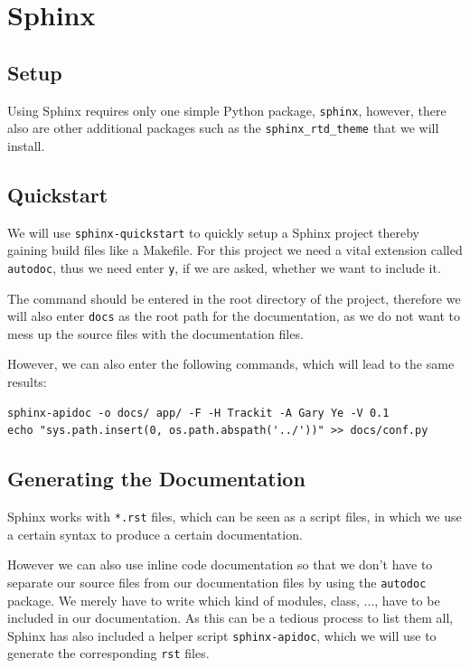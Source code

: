 \documentclass[../main/main.tex]{subfiles}
\begin{document}
\section{Sphinx}

\subsection{Setup}

Using Sphinx requires only one simple Python package, \lstinline|sphinx|,
however, there also are other additional packages such as the
\lstinline|sphinx_rtd_theme| that we will install. 

\subsection{Quickstart}

We will use \lstinline|sphinx-quickstart| to quickly setup a Sphinx project
thereby gaining build files like a Makefile. For this project we need a vital
extension called \lstinline|autodoc|, thus we need enter \lstinline|y|, if we
are asked, whether we want to include it. 

The command should be entered in the root directory of the project, therefore
we will also enter \lstinline|docs| as the root path for the documentation, as
we do not want to mess up the source files with the documentation files. 

However, we can also enter the following commands, which will lead to the same
results: 

\begin{lstlisting}
sphinx-apidoc -o docs/ app/ -F -H Trackit -A Gary Ye -V 0.1
echo "sys.path.insert(0, os.path.abspath('../'))" >> docs/conf.py
\end{lstlisting}

\subsection{Generating the Documentation}

Sphinx works with \lstinline|*.rst| files, which can be seen as a script files,
in which we use a certain syntax to produce a certain documentation. 

However we can also use inline code documentation so that we don't have to
separate our source files from our documentation files by using the
\lstinline|autodoc| package. We merely have to write which kind of modules,
class, ..., have to be included in our documentation. As this can be a tedious
process to list them all, Sphinx has also included a helper script
\lstinline|sphinx-apidoc|, which we will use to generate the corresponding
\lstinline|rst| files. 
\end{document}
